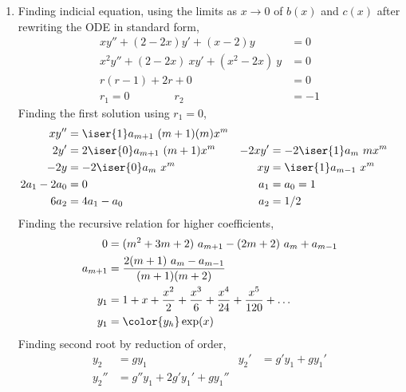\begin{enumerate}
    \item Finding indicial equation, using the limits as $ x \rightarrow 0 $
          of $ b(x) $ and $ c(x) $ after rewriting the ODE in standard form,
          \begin{align}
              xy'' + (2-2x)y' + (x-2)y               & = 0  \\
              x^2y'' + (2 - 2x)\ xy' + (x^2 - 2x)\ y & = 0  \\
              r(r-1) + 2r + 0                        & = 0  \\
              r_1 = 0 \qquad\qquad r_2               & = -1
          \end{align}
          Finding the first solution using $ r_1 = 0 $,
          \begin{align}
              xy''        & = \iser{1}a_{m+1}\ (m+1)(m)x^{m} & \\
              2y'         & = 2\iser{0}a_{m+1}\ (m+1) x^{m}  &
              -2xy'       & = -2\iser{1}a_m\ m x^{m}           \\
              -2y         & = -2\iser{0}a_{m}\ x^{m}         &
              xy          & = \iser{1}a_{m-1}\ x^{m}           \\
              2a_1 - 2a_0 & = 0                              &
              a_1         & = a_0 = 1                          \\
              6a_2        & = 4a_1 - a_0                     &
              a_2         & = 1/2
          \end{align}
          Finding the recursive relation for higher coefficients,
          \begin{align}
              0       & = (m^2+ 3m + 2)\ a_{m+1} - (2m + 2)\ a_m + a_{m-1}         \\
              a_{m+1} & = \frac{2(m+1)\ a_m - a_{m-1}}{(m+1)(m+2)}                 \\
              y_1     & =  1  + x + \frac{x^2}{2} + \frac{x^3}{6} + \frac{x^4}{24}
              + \frac{x^5}{120} + \dots                                            \\
              y_1     & = \color{y_h} \exp(x)
          \end{align}
          Finding second root by reduction of order,
          \begin{align}
              y_2       & = gy_1                              &
              y_2'      & = g'y_1 + gy_1'                       \\
              y_2''     & = g''y_1 + 2g'y_1' + gy_1''           \\

\end{align}
\end{enumerate}
